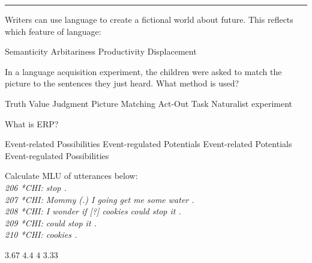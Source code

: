 \documentclass[legalpaper, 12pt, addpoints, answers]{exam}
\begin{document}
\vspace{0.15in}
\hrule 
\vspace{0.15in}
\begin{questions}


\setlength{\multicolsep}{0.5em}
    \question Writers can use language to create a fictional world about future. This reflects which feature of language:
    
        \begin{choices} 
            \choice  Semanticity
            \choice  Arbitariness
            \choice  Productivity
            \choice  Displacement
        \end{choices}
        \vspace{0.15in}

\question In a language acquisition experiment, the children were asked to match the picture to the sentences they just heard. What method is used?

    \begin{choices}
            \choice Truth Value Judgment
            \choice Picture Matching
            \choice Act-Out Task
            \choice Naturalist experiment
    \end{choices}
    \vspace{0.15in}

    \question What is ERP?
    
    \begin{choices}
            \choice Event-related Possibilities
            \choice Event-regulated Potentials
            \choice Event-related Potentials
            \choice Event-regulated Possibilities 
    \end{choices}
    \vspace{0.15in}

     \question Calculate MLU of utterances below:\\
     \textit{
     206	*CHI:	stop .\\
     207	*CHI:	Mommy (.) I going get me some water .\\
     208	*CHI:	I wonder if [?] cookies could stop it .\\ 
     209	*CHI:	could stop it .\\
     210	*CHI:	cookies .\\}
     
        \begin{oneparchoices}
            \choice \(3.67\)
            \choice \(4.4\)
            \choice \(4\)
            \choice \(3.33\)
        \end{oneparchoices}
\vspace{0.15in}
    

\end{questions}
\end{document}
